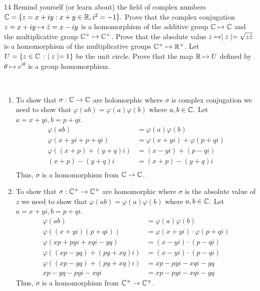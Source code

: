 \documentclass[12pt]{article}
\begin{document}
\newpage
\begin{problem}{14}
    Remind yourself (or learn about) the field of complex numbers $\mathbb C = \{ z = x + iy: x + y \in \mathbb R, i^2 = -1\}.$ Prove that the complex conjugation $z = x + iy \mapsto \Bar{z} = x - iy $ is a homomorphism of the additive group $\mathbb C \mapsto \mathbb C$ and the multiplicative group $\mathbb C^\times \mapsto \mathbb C^\times$. Prove that the absolute value $z \mapsto \mid z \mid = \sqrt{z\Bar{z}}$ is a homomorphism of the multiplicative groups $\mathbb C^\times \mapsto \mathbb R^\times$. Let $U = \{ z \in \mathbb C \, : \ \mid z \mid = 1 \}$ be the unit circle. Prove that the map $\mathbb R \mapsto U$ defined by $\theta \mapsto e^{i\theta}$ is a group homomorphism. 
\end{problem}

\begin{solution}
    \bbni \\
    \begin{enumerate}
        \item To show that $\sigma : \mathbb C \to \mathbb C$ are holomorphic where $\sigma$ is complex conjugation we need to show that $\varphi(ab) = \varphi(a)\varphi(b)$ where $a, b \in \mathbb C.$ Let $a = x + yi, b  = p + qi$.
        \begin{align*}
            \varphi(ab) &= \varphi(a)\varphi(b) \\ 
            \varphi(x + yi + p + qi) &= \varphi(x+yi) + \varphi(p + qi) \\ 
            \varphi ((x+p) + (y+q)i) &= (x- yi) + (p -qi) \\
            (x + p) - (y+q)i &=(x + p ) - (y+q)i \\
        \end{align*}
        Thus, $\sigma$ is a homomorphism from $\mathbb C \to \mathbb C$. 

        \item To show that $\sigma : \mathbb C^\times \to \mathbb C^\times$ are homomorphic where $\sigma$ is the absolute value of $z$ we need to show that $\varphi(ab) = \varphi(a)\varphi(b)$ where $a, b \in \mathbb C.$ Let $a = x + yi, b  = p + qi$.
        \begin{align*}
            \varphi(ab) &= \varphi(a)\varphi(b) \\ 
            \varphi((x + yi) ( p + qi)) &= \varphi(x+yi) \cdot \varphi(p + qi) \\ 
            \varphi (xp + pyi + xqi - yq) &= (x- yi) \cdot (p -qi) \\
            \varphi ((xp -yq) + (py + xq)i) &= (x- yi) \cdot (p -qi) \\
            \varphi((xp - yq) + (py +xq)i) &= xp - pyi -xqi - yq \\
            xp - yq - pyi -xqi &= xp -pyi -xqi -yq 
        \end{align*}
        Thus, $\sigma$ is a homomorphism from $\mathbb C^\times \to \mathbb C^\times$. 


\end{enumerate}
\end{solution}
\end{document}
